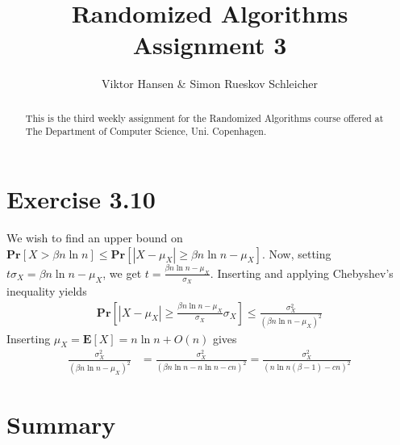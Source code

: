 \documentclass[12pt]{article}
\begin{document}
\nocite{*}


\title{Randomized Algorithms \\
       Assignment 3}

\author{Viktor Hansen \& Simon Rueskov Schleicher}

\maketitle

\begin{abstract}
  This is the third weekly assignment for the Randomized Algorithms course offered at The Department of Computer Science, Uni. Copenhagen.
\end{abstract}

\pagebreak

\section*{Exercise 3.10}
We wish to find an upper bound on $\mathbf{Pr} \left[ X > \beta n \ln n \right] \leq \mathbf{Pr} \left[ \left| X - \mu_X \right| \geq \beta n \ln n - \mu_X \right]$. Now, setting $t\sigma_X = \beta n \ln n - \mu_X$, we get $t = \frac{\beta n \ln n - \mu_X}{\sigma_X}$. Inserting and applying Chebyshev's inequality yields
\begin{align*}
\mathbf{Pr} \left[ \left| X - \mu_X \right| \geq \frac{\beta n \ln n - \mu_X}{\sigma_X} \sigma_X \right] \leq \frac{\sigma_X^2}{(\beta n \ln n - \mu_X)^2}
\end{align*}
Inserting $\mu_X = \mathbf{E} \left[ X \right] = n \ln n + O(n)$ gives
\begin{align*}
\frac{\sigma_X^2}{(\beta n \ln n - \mu_X)^2} &= \frac{\sigma_X^2}{(\beta n \ln n - n \ln n - cn)^2} = \frac{\sigma_X^2}{(n \ln n(\beta - 1) - cn)^2}
\end{align*}

\pagebreak

\section*{Summary}
\end{document}
